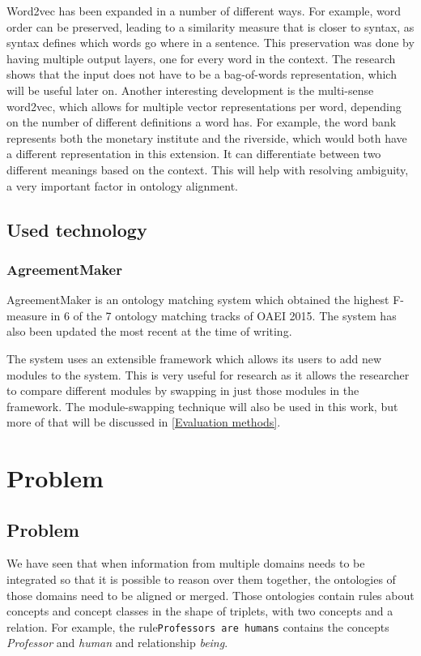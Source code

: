 \documentclass{article}
\begin{document}
 Word2vec has been expanded in a number of different ways. For example, word order can be preserved, leading to a similarity measure that is closer to syntax, as syntax defines which words go where in a sentence. This preservation was done by having multiple output layers, one for every word in the context. The research shows that the input does not have to be a bag-of-words representation, which will be useful later on. \cite{ling2015}
 Another interesting development is the multi-sense word2vec, which allows for multiple vector representations per word, depending on the number of different definitions a word has. For example, the word bank represents both the monetary institute and the riverside, which would both have a different representation in this extension. It can differentiate between two different meanings based on the context. This will help with resolving ambiguity, a very important factor in ontology alignment.\cite{multisense}
 \subsection{Used technology}
 \subsubsection{AgreementMaker}
 AgreementMaker is an ontology matching system which obtained the highest F-measure in 6 of the 7 ontology matching tracks of OAEI 2015. \cite{OAEI2015} The system has also been updated the most recent at the time of writing\cite{agreementmaker}.
 
 The system uses an extensible framework which allows its users to add new modules to the system. This is very useful for research as it allows the researcher to compare different modules by swapping in just those modules in the framework. The module-swapping technique will also be used in this work, but more of that will be discussed in \ref{Evaluation methods}.
 \section{Problem}

 \subsection{Problem}
 We have seen that when information from multiple domains needs to be integrated so that it is possible to reason over them together, the ontologies of those domains need to be aligned or merged. %
  Those ontologies contain rules about concepts and concept classes in the shape of triplets, with two concepts and a relation. For example, the rule{\tt Professors are humans} contains the concepts \emph{Professor} and \emph{human} and relationship \emph{being}.
 
\end{document}
